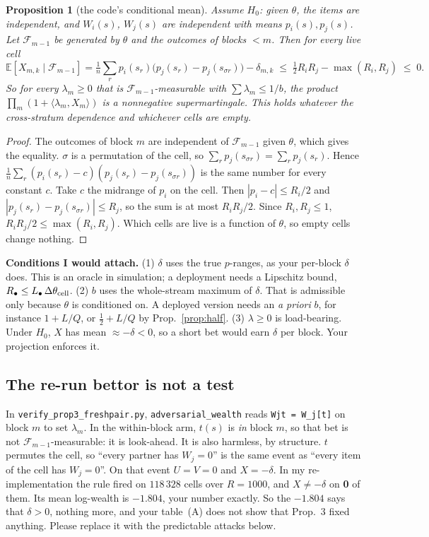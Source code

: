 \documentclass[11pt]{article}
\newtheorem{proposition}{Proposition}
\newcommand{\E}{\mathbb{E}}
\newcommand{\Fc}{\mathcal{F}}
\begin{document}
\begin{proposition}[the code's conditional mean]\label{prop:code}
Assume $H_0$: given $\theta$, the items are independent, and $W_i(s)$, $W_j(s)$ are independent with means $p_i(s),p_j(s)$.
Let $\Fc_{m-1}$ be generated by $\theta$ and the outcomes of blocks $<m$. Then for every live cell
\[
\E[X_{m,k}\mid\Fc_{m-1}]=\tfrac1n\textstyle\sum_r p_i(s_r)\big(p_j(s_r)-p_j(s_{\sigma r})\big)-\delta_{m,k}\;\le\;\tfrac12R_iR_j-\max(R_i,R_j)\;\le\;0 .
\]
So for every $\lambda_m\ge0$ that is $\Fc_{m-1}$-measurable with $\sum\lambda_m\le1/b$, the product $\prod_m(1+\langle\lambda_m,X_m\rangle)$ is a nonnegative supermartingale. This holds whatever the cross-stratum dependence and whichever cells are empty.
\end{proposition}
\begin{proof}
The outcomes of block $m$ are independent of $\Fc_{m-1}$ given $\theta$, which gives the equality. $\sigma$ is a permutation of the cell, so $\sum_r p_j(s_{\sigma r})=\sum_r p_j(s_r)$. Hence $\tfrac1n\sum_r(p_i(s_r)-c)(p_j(s_r)-p_j(s_{\sigma r}))$ is the same number for every constant $c$.
Take $c$ the midrange of $p_i$ on the cell. Then $|p_i-c|\le R_i/2$ and $|p_j(s_r)-p_j(s_{\sigma r})|\le R_j$, so the sum is at most $R_iR_j/2$.
Since $R_i,R_j\le1$, $R_iR_j/2\le\max(R_i,R_j)$. Which cells are live is a function of $\theta$, so empty cells change nothing.
\end{proof}
\textbf{Conditions I would attach.} (1) $\delta$ uses the true $p$-ranges, as your per-block $\delta$ does. This is an oracle in simulation; a deployment needs a Lipschitz bound, $R_\bullet\le L_\bullet\,\Delta\theta_{\rm cell}$.
(2) $b$ uses the whole-stream maximum of $\delta$. That is admissible only because $\theta$ is conditioned on. A deployed version needs an \emph{a priori} $b$, for instance $1+L/Q$, or $\tfrac12+L/Q$ by Prop.~\ref{prop:half}.
(3) $\lambda\ge0$ is load-bearing. Under $H_0$, $X$ has mean $\approx-\delta<0$, so a short bet would earn $\delta$ per block. Your projection enforces it.

\subsection{The re-run bettor is not a test}\label{sec:rerun}
In \texttt{verify\_prop3\_freshpair.py}, \texttt{adversarial\_wealth} reads \texttt{Wjt = W\_j[t]} on block $m$ to set $\lambda_m$. In the within-block arm, $t(s)$ is \emph{in} block $m$, so that bet is not $\Fc_{m-1}$-measurable: it is look-ahead.
It is also harmless, by structure. $t$ permutes the cell, so ``every partner has $W_j=0$'' is the same event as ``every item of the cell has $W_j=0$''. On that event $U=V=0$ and $X=-\delta$.
In my re-implementation the rule fired on $118\,328$ cells over $R=1000$, and $X\neq-\delta$ on \textbf{0} of them. Its mean log-wealth is $-1.804$, your number exactly.
So the $-1.804$ says that $\delta>0$, nothing more, and your table~(A) does not show that Prop.~3 fixed anything. Please replace it with the predictable attacks below.
\end{document}
